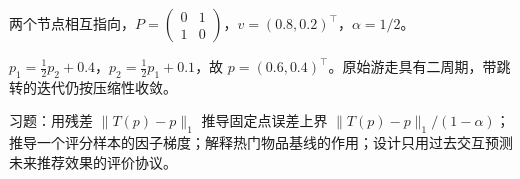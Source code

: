 \begin{example}
两个节点相互指向，$P=\left(\begin{smallmatrix}0&1\\1&0\end{smallmatrix}\right)$，$v=(0.8,0.2)^\top$，$\alpha=1/2$。
\end{example}
\begin{solve}
$p_1=\frac12p_2+0.4$，$p_2=\frac12p_1+0.1$，故 $p=(0.6,0.4)^\top$。原始游走具有二周期，带跳转的迭代仍按压缩性收敛。
\end{solve}

习题：用残差 $\|T(p)-p\|_1$ 推导固定点误差上界 $\|T(p)-p\|_1/(1-\alpha)$；推导一个评分样本的因子梯度；解释热门物品基线的作用；设计只用过去交互预测未来推荐效果的评价协议。





